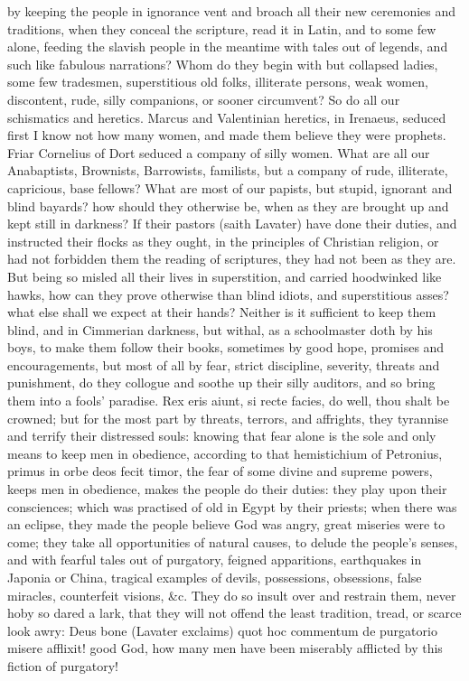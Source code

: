 {by keeping the people in ignorance vent and broach all their new
ceremonies and traditions, when they conceal the scripture, read it in
Latin, and to some few alone, feeding the slavish people in the
meantime with tales out of legends, and such like fabulous narrations?
Whom do they begin with but collapsed ladies, some few tradesmen,
superstitious old folks, illiterate persons, weak women, discontent,
rude, silly companions, or sooner circumvent? So do all our schismatics
and heretics. Marcus and Valentinian heretics, in Irenaeus,
seduced first I know not how many women, and made them believe they
were prophets. Friar Cornelius of Dort seduced a company of silly
women. What are all our Anabaptists, Brownists, Barrowists, familists,
but a company of rude, illiterate, capricious, base fellows? What are
most of our papists, but stupid, ignorant and blind bayards? how should
they otherwise be, when as they are brought up and kept still in
darkness? If their pastors (saith Lavater) have done their
duties, and instructed their flocks as they ought, in the principles of
Christian religion, or had not forbidden them the reading of
scriptures, they had not been as they are. But being so misled all
their lives in superstition, and carried hoodwinked like hawks, how can
they prove otherwise than blind idiots, and superstitious asses? what
else shall we expect at their hands? Neither is it sufficient to keep
them blind, and in Cimmerian darkness, but withal, as a schoolmaster
doth by his boys, to make them follow their books, sometimes by good
hope, promises and encouragements, but most of all by fear, strict
discipline, severity, threats and punishment, do they collogue and
soothe up their silly auditors, and so bring them into a fools'
paradise. Rex eris aiunt, si recte facies, do well, thou shalt be
crowned; but for the most part by threats, terrors, and affrights, they
tyrannise and terrify their distressed souls: knowing that fear alone
is the sole and only means to keep men in obedience, according to that
hemistichium of Petronius, primus in orbe deos fecit timor, the fear of
some divine and supreme powers, keeps men in obedience, makes the
people do their duties: they play upon their consciences; which
was practised of old in Egypt by their priests; when there was an
eclipse, they made the people believe God was angry, great miseries
were to come; they take all opportunities of natural causes, to delude
the people's senses, and with fearful tales out of purgatory, feigned
apparitions, earthquakes in Japonia or China, tragical examples of
devils, possessions, obsessions, false miracles, counterfeit visions,
\&c. They do so insult over and restrain them, never hoby so dared a
lark, that they will not offend the least tradition, tread, or
scarce look awry: Deus bone (Lavater exclaims) quot hoc commentum
de purgatorio misere afflixit! good God, how many men have been
miserably afflicted by this fiction of purgatory!

}
